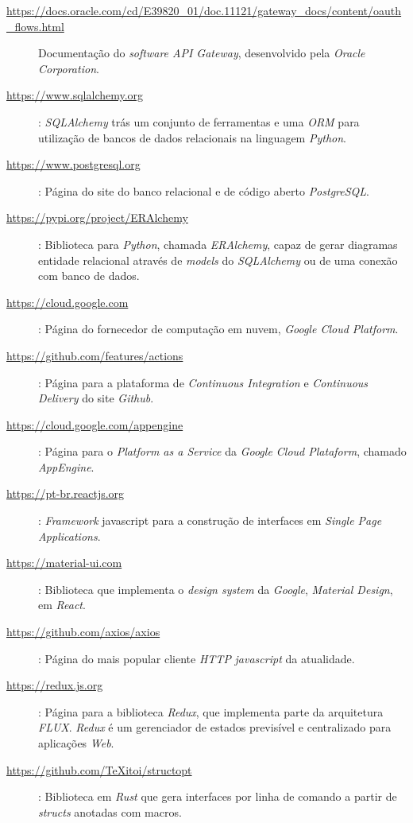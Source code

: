\begin{description}
    \label{link:oauth}
    \item[\url{https://docs.oracle.com/cd/E39820_01/doc.11121/gateway_docs/content/oauth_flows.html}]
Documentação do \emph{software API Gateway}, desenvolvido pela \emph{Oracle Corporation}.

\label{link:sql_alchemy}
\item[\url{https://www.sqlalchemy.org}]: \emph{SQLAlchemy} trás um 
  conjunto de ferramentas e uma \emph{ORM} para utilização de bancos de dados relacionais 
  na linguagem \emph{Python}.

  \label{link:postgresql}
\item[\url{https://www.postgresql.org}]: Página do site do banco relacional e de código aberto 
  \emph{PostgreSQL}.

\label{link:eralchemy}
\item[\url{https://pypi.org/project/ERAlchemy}]: Biblioteca para \emph{Python}, chamada \emph{ERAlchemy}, 
  capaz de gerar diagramas entidade relacional através de \emph{models} do \emph{SQLAlchemy} ou de uma conexão 
  com banco de dados.

  \label{link:gcp}
\item[\url{https://cloud.google.com}]: Página do fornecedor de computação em nuvem, \emph{Google 
    Cloud Platform}.

  \label{link:actions}
\item[\url{https://github.com/features/actions}]: Página para a plataforma de \emph{Continuous Integration}
    e \emph{Continuous Delivery} do site \emph{Github}.

    \label{link:appengine}
\item[\url{https://cloud.google.com/appengine}]: Página para o \emph{Platform as a Service} da 
  \emph{Google Cloud Plataform}, chamado \emph{AppEngine}.

  \label{link:react}
\item[\url{https://pt-br.reactjs.org}]: \emph{Framework} javascript para a construção 
  de interfaces em \emph{Single Page Applications}.

  \label{link:mui}
\item[\url{https://material-ui.com}]: Biblioteca que implementa o \emph{design system} da 
  \emph{Google}, \emph{Material Design}, em \emph{React}.

  \label{link:axios}
\item[\url{https://github.com/axios/axios}]: Página do mais popular cliente \emph{HTTP} 
  \emph{javascript} da atualidade.

  \label{link:axios}
\item[\url{https://redux.js.org}]: Página para a biblioteca \emph{Redux}, que implementa 
  parte da arquitetura \emph{FLUX}. \emph{Redux} é um gerenciador de estados previsível 
  e centralizado para aplicações \emph{Web}.

  \label{link:struct_opt}
\item[\url{https://github.com/TeXitoi/structopt}]: Biblioteca em \emph{Rust} que gera 
  interfaces por linha de comando a partir de \emph{structs} anotadas com macros. 


\end{description}
